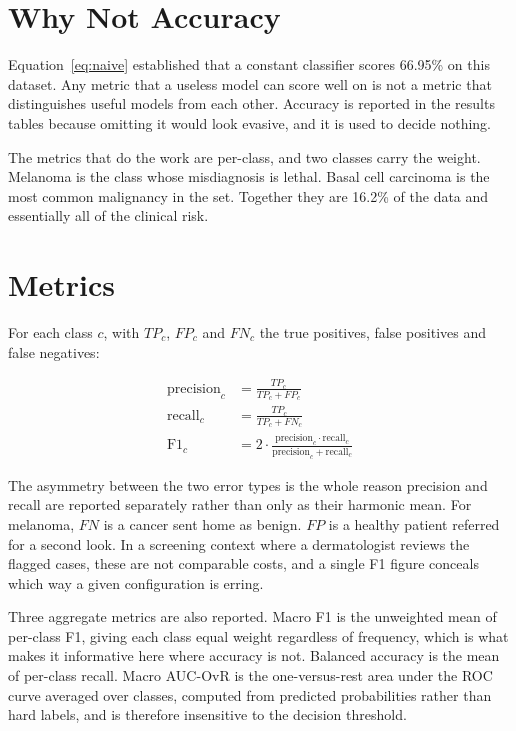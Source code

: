 \section{Why Not Accuracy}
\label{sec:eval-why}

Equation~\ref{eq:naive} established that a constant classifier scores 66.95\% on this
dataset. Any metric that a useless model can score well on is not a metric that
distinguishes useful models from each other. Accuracy is reported in the results tables
because omitting it would look evasive, and it is used to decide nothing.

The metrics that do the work are per-class, and two classes carry the weight. Melanoma
is the class whose misdiagnosis is lethal. Basal cell carcinoma is the most common
malignancy in the set. Together they are 16.2\% of the data and essentially all of the
clinical risk.

\section{Metrics}
\label{sec:eval-metrics}

For each class $c$, with $TP_c$, $FP_c$ and $FN_c$ the true positives, false positives
and false negatives:

\begin{align}
  \mathrm{precision}_c &= \frac{TP_c}{TP_c + FP_c} \label{eq:precision}\\[0.4em]
  \mathrm{recall}_c    &= \frac{TP_c}{TP_c + FN_c} \label{eq:recall}\\[0.4em]
  \mathrm{F1}_c        &= 2 \cdot \frac{\mathrm{precision}_c \cdot \mathrm{recall}_c}
                                       {\mathrm{precision}_c + \mathrm{recall}_c}
                          \label{eq:f1}
\end{align}

The asymmetry between the two error types is the whole reason precision and recall are
reported separately rather than only as their harmonic mean. For melanoma, $FN$ is a
cancer sent home as benign. $FP$ is a healthy patient referred for a second look. In a
screening context where a dermatologist reviews the flagged cases, these are not
comparable costs, and a single F1 figure conceals which way a given configuration is
erring.

Three aggregate metrics are also reported. Macro F1 is the unweighted mean of per-class
F1, giving each class equal weight regardless of frequency, which is what makes it
informative here where accuracy is not. Balanced accuracy is the mean of per-class
recall. Macro AUC-OvR is the one-versus-rest area under the ROC curve averaged over
classes, computed from predicted probabilities rather than hard labels, and is therefore
insensitive to the decision threshold.


